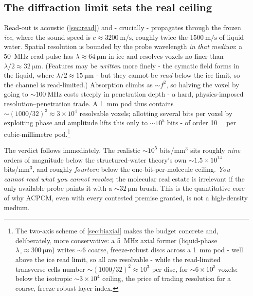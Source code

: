 \documentclass[11pt]{article}
\theoremstyle{definition}
\begin{document}
\subsection{The diffraction limit sets the real ceiling}
\label{sec:diffraction}
Read-out is acoustic (\cref{sec:read}) and - crucially - propagates through the frozen
\emph{ice}, where the sound speed is $c\approx\qty{3200}{\meter\per\second}$, roughly twice
the $\qty{1500}{\meter\per\second}$ of liquid water. Spatial resolution is bounded by the
probe wavelength \emph{in that medium}: a \qty{50}{\mega\hertz} read pulse has
$\lambda\approx\qty{64}{\micro\meter}$ in ice and resolves voxels no finer than
$\lambda/2\approx\qty{32}{\micro\meter}$. (Features may be \emph{written} more finely - the
cymatic field forms in the liquid, where $\lambda/2\approx\qty{15}{\micro\meter}$ - but they
cannot be \emph{read} below the ice limit, so the channel is read-limited.) Absorption climbs
as ${\sim}f^2$, so halving the voxel by going to ${\sim}\qty{100}{\mega\hertz}$ costs steeply
in penetration depth - a hard, physics-imposed resolution--penetration trade. A
\qty{1}{\milli\meter} pod thus contains ${\sim}(1000/32)^3\approx 3\times10^{4}$ resolvable
voxels; allotting several bits per voxel by exploiting phase and amplitude lifts this only to
${\sim}10^{5}$ bits - of order \qty{10}{\kilo\byte} per cubic-millimetre pod.\footnote{The
two-axis scheme of \cref{sec:biaxial} makes the budget concrete and, deliberately, more
conservative: a \qty{5}{\mega\hertz} axial former (liquid-phase
$\lambda_z\approx\qty{300}{\micro\meter}$) writes ${\sim}6$ coarse, freeze-robust discs
across a \qty{1}{\milli\meter} pod - well above the ice read limit, so all are resolvable -
while the read-limited transverse cells number ${\sim}(1000/32)^2\approx 10^{3}$ per disc,
for ${\sim}6\times10^{3}$ voxels: below the isotropic ${\sim}3\times10^{4}$ ceiling, the
price of trading resolution for a coarse, freeze-robust layer index.}

The verdict follows immediately. The realistic ${\sim}10^{5}$ bits/mm$^3$ sits roughly
\emph{nine} orders of magnitude below the structured-water theory's own
${\sim}1.5\times10^{14}$ bits/mm$^3$, and roughly \emph{fourteen} below the
one-bit-per-molecule ceiling. \emph{You cannot read what you cannot resolve}; the molecular
real estate is irrelevant if the only available probe paints it with a
${\sim}\qty{32}{\micro\meter}$ brush.
This is the quantitative core of why ACPCM, even with every contested premise granted, is not
a high-density medium.
\end{document}
